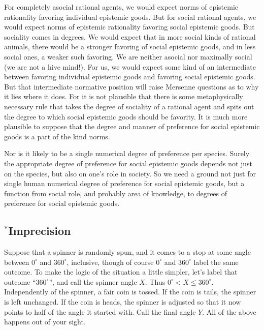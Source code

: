 For completely asocial rational agents, we would expect norms of epistemic rationality favoring individual epistemic goods. But for 
social rational agents, we would expect norms of epistemic rationality favoring social epistemic goods. But sociality comes in degrees.
We would expect that in more social kinds of rational animals, there would be a stronger favoring of social epistemic goods, and in
less social ones, a weaker such favoring. We are neither asocial nor maximally social (we are not a hive mind!). For us, we would expect
some kind of an intermediate between favoring individual epistemic goods and favoring social epistemic goods. But that intermediate 
normative position will raise Mersenne questions as to why it lies where it does. For it is not plausible that there is some 
metaphysically necessary rule that takes the degree of sociality of a rational agent and spits out the degree to which social epistemic 
goods should be favority. It is much more plausible to suppose that the degree and manner of preference for social epistemic goods is 
a part of the kind norms. 

Nor is it likely to be a single numerical degree of preference per species. Surely the appropriate degree of preference for social epistemic 
goods depends not just on the species, but also on one's role in society. So we need a ground not just for single human numerical degree of
preference for social epistemic goods, but a function from social role, and probably area of knowledge, to degrees of preference for
social epistemic goods.

\subsection{$^*$Imprecision}
Suppose that a spinner is randomly spun, and it comes to a stop at some angle between $0^\circ$ and $360^\circ$, inclusive,
though of course $0^\circ$ and $360^\circ$ label the same outcome. To make the logic of the situation a little simpler, 
let's label that outcome ``$360^\circ$'', and call the spinner angle $X$. Thus $0^\circ < X \le 360^\circ$.
Independently of the spinner, a fair coin is tossed. If the coin is tails, the spinner is left
unchanged. If the coin is heads, the spinner is adjusted so that it now points to half of the angle it started with. Call the 
final angle $Y$. All of the above happens out of your sight.


